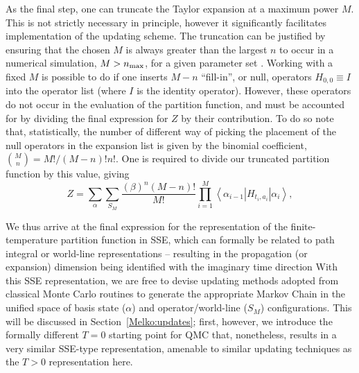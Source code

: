 \documentclass[vecphys]{svmult}
\begin{document}
As the final step, one can truncate the Taylor expansion at a maximum power $M$.  This is not strictly necessary in principle, however it significantly facilitates implementation of the updating scheme.  The truncation can be justified 
by ensuring that the chosen $M$ is always greater than the largest $n$ to occur in a numerical simulation, $M>n_{\rm max}$, for a given parameter set \cite{Melko:SandvikHeis}.  
Working with a fixed $M$ is possible to do if one inserts $M-n$ ``fill-in'', or null, operators $H_{0,0} \equiv I$ into the operator list (where $I$ is the identity operator).  However, these operators do not occur in the evaluation of the partition function, and must be accounted for by dividing the final expression for $Z$ by their contribution.  To do so note that, statistically, the number of different way of picking the placement of the null operators in the expansion list is given by the binomial coefficient,
${M \choose n}= M!/(M-n)!n!$.  One is required to divide our truncated partition function by this value, giving\begin{equation}Z=\sum_{\alpha} \sum_{S_M} \frac{ (\beta)^n (M-n)!}{M !}  %
 \prod_{i=1}^{M}  \left\langle{\alpha_{i-1}  \left|  {H_{t_i,a_i}}  \right| \alpha_i   }\right\rangle,
 \label{Zsse3}
\end{equation}

We thus arrive at the final expression for the representation of the finite-temperature partition function in SSE, which 
can formally be related to path integral or world-line representations -- resulting in the propagation (or expansion) dimension being identified with the imaginary time direction \cite{Melko:HK,Melko:Assaad07}
With this SSE representation, we are free to devise updating methods adopted from classical Monte Carlo routines to generate the appropriate Markov Chain in the unified space of  basis state ($\alpha$) and operator/world-line ($S_M$) configurations.  This will be discussed in Section~\ref{Melko:updates}; first, however, we introduce the formally different $T=0$ starting point for QMC that, nonetheless, results in a very similar SSE-type representation, amenable to similar updating techniques as the $T > 0$ representation here.
\end{document}
